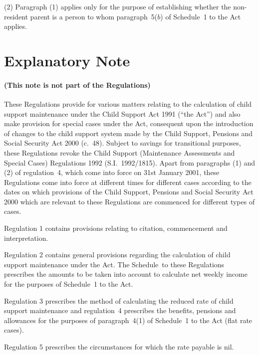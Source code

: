 \documentclass[12pt,a4paper]{article}
\begin{document}
(2) Paragraph (1) applies only for the purpose of establishing whether the non-resident parent is a person to whom paragraph~5($b$)  of Schedule~1 to the Act applies.


\part{Explanatory Note}

\renewcommand\parthead{--- Explanatory Note}

\subsection*{(This note is not part of the Regulations)}

These Regulations provide for various matters relating to the calculation of child support maintenance under the Child Support Act 1991 (“the Act”) and also make provision for special cases under the Act, consequent upon the introduction of changes to the child support system made by the Child Support, Pensions and Social Security Act 2000 (c.\ 48). Subject to savings for transitional purposes, these Regulations revoke the Child Support (Maintenance Assessments and Special Cases) Regulations 1992 (S.I.~1992/1815). Apart from paragraphs (1) and (2) of regulation~4, which come into force on 31st January 2001, these Regulations come into force at different times for different cases according to the dates on which provisions of the Child Support, Pensions and Social Security Act 2000 which are relevant to these Regulations are commenced for different types of cases.

Regulation 1 contains provisions relating to citation, commencement and interpretation.

Regulation 2 contains general provisions regarding the calculation of child support maintenance under the Act. The Schedule~to these Regulations prescribes the amounts to be taken into account to calculate net weekly income for the purposes of Schedule~1 to the Act.

Regulation 3 prescribes the method of calculating the reduced rate of child support maintenance and regulation~4 prescribes the benefits, pensions and allowances for the purposes of paragraph~4(1) of Schedule~1 to the Act (flat rate cases).

Regulation 5 prescribes the circumstances for which the rate payable is nil.
\end{document}

